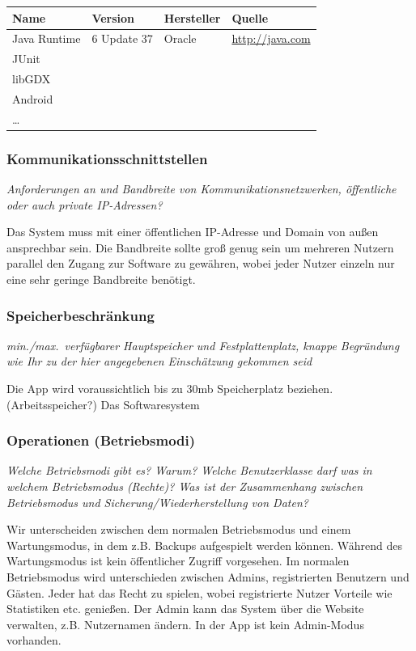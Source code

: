 \documentclass[fontsize=12pt,paper=a4,twoside]{scrartcl}
\begin{document}
  \begin{tabular}{|l|l|l|l|}\hline
    \textbf{Name} & \textbf{Version} & \textbf{Hersteller} & \textbf{Quelle} \\\hline
    Java Runtime & 6 Update 37 & Oracle & \url{http://java.com} \\\hline
    JUnit & & & \\\hline
    libGDX &  &  & \\\hline
    Android & & & \\\hline
    \ldots & & & \\\hline
  \end{tabular}

\subsubsection{Kommunikationsschnittstellen}
{\em Anforderungen an und Bandbreite von Kommunikationsnetzwerken, öffentliche
  oder auch private IP-Adressen?}
  
Das System muss mit einer öffentlichen IP-Adresse und Domain von außen ansprechbar sein. Die Bandbreite sollte groß genug sein um mehreren Nutzern parallel den Zugang zur Software zu gewähren, wobei jeder Nutzer einzeln nur eine sehr geringe Bandbreite benötigt.

\subsubsection{Speicherbeschränkung}

  {\em min./max.\ verfügbarer Hauptspeicher und Festplattenplatz, knappe Begründung wie Ihr zu
der hier angegebenen Einschätzung gekommen seid}

Die App wird voraussichtlich bis zu 30mb Speicherplatz beziehen. (Arbeitsspeicher?)
Das Softwaresystem 

\subsubsection{Operationen (Betriebsmodi)}
  {\em Welche Betriebsmodi gibt es? Warum? Welche Benutzerklasse darf
  was in welchem Betriebsmodus (Rechte)? Was ist der Zusammenhang
  zwischen Betriebsmodus und Sicherung/Wiederherstellung von Daten?}
  
Wir unterscheiden zwischen dem normalen Betriebsmodus und einem Wartungsmodus, in dem z.B. Backups aufgespielt werden können. Während des Wartungsmodus ist kein öffentlicher Zugriff vorgesehen. Im normalen Betriebsmodus wird unterschieden zwischen Admins, registrierten Benutzern und Gästen. Jeder hat das Recht zu spielen, wobei registrierte Nutzer Vorteile wie Statistiken etc. genießen. Der Admin kann das System über die Website verwalten, z.B. Nutzernamen ändern. In der App ist kein Admin-Modus vorhanden.
\end{document}
